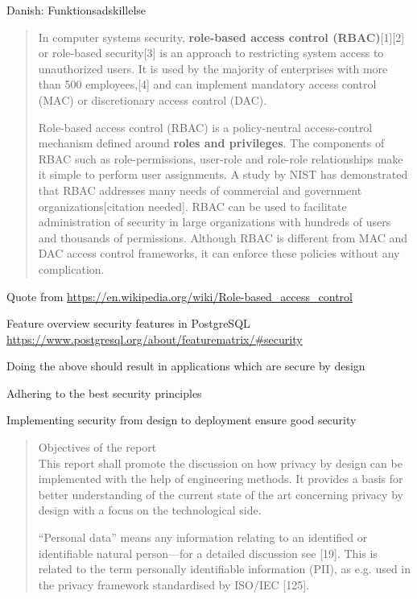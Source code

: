 \documentclass[Screen16to9,17pt]{foils}
\begin{document}
Danish: Funktionsadskillelse



\begin{quote}
In computer systems security, {\bf role-based access control (RBAC)}[1][2] or role-based security[3] is an approach to restricting system access to unauthorized users. It is used by the majority of enterprises with more than 500 employees,[4] and can implement mandatory access control (MAC) or discretionary access control (DAC).

Role-based access control (RBAC) is a policy-neutral access-control mechanism defined around {\bf roles and privileges}. The components of RBAC such as role-permissions, user-role and role-role relationships make it simple to perform user assignments. A study by NIST has demonstrated that RBAC addresses many needs of commercial and government organizations[citation needed]. RBAC can be used to facilitate administration of security in large organizations with hundreds of users and thousands of permissions. Although RBAC is different from MAC and DAC access control frameworks, it can enforce these policies without any complication.
\end{quote}
Quote from \url{https://en.wikipedia.org/wiki/Role-based_access_control}




Feature overview security features in PostgreSQL\\
\url{https://www.postgresql.org/about/featurematrix/#security}



\begin{list2}
\item Doing the above should result in applications which are secure by design
\item Adhering to the best security principles
\item Implementing security from design to deployment ensure good security
\end{list2}



\begin{quote}
Objectives of the report\\
This report shall promote the discussion on how privacy by design can be implemented with the help
of engineering methods. It provides a basis for better understanding of the current state of the art
concerning privacy by design with a focus on the technological side.

“Personal data” means any information relating to an identified or identifiable natural person—for a
detailed discussion see [19]. This is related to the term personally identifiable information (PII), as e.g.
used in the privacy framework standardised by ISO/IEC [125].
\end{quote}
\end{document}
